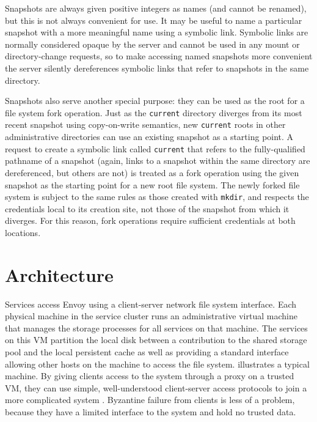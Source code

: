 Snapshots are always given positive integers as names (and cannot be renamed), but this is not always convenient for use. It may be useful to name a particular snapshot with a more meaningful name using a symbolic link. Symbolic links are normally considered opaque by the server and cannot be used in any mount or directory-change requests, so to make accessing named snapshots more convenient the server silently dereferences symbolic links that refer to snapshots in the same directory.

Snapshots also serve another special purpose: they can be used as the root for a file system fork operation. Just as the \texttt{current} directory diverges from its most recent snapshot using copy-on-write semantics, new \texttt{current} roots in other administrative directories can use an existing snapshot as a starting point. A request to create a symbolic link called \texttt{current} that refers to the fully-qualified pathname of a snapshot (again, links to a snapshot within the same directory are dereferenced, but others are not) is treated as a fork operation using the given snapshot as the starting point for a new root file system. The newly forked file system is subject to the same rules as those created with \texttt{mkdir}, and respects the credentials local to its creation site, not those of the snapshot from which it diverges. For this reason, fork operations require sufficient credentials at both locations.

\section{Architecture}

Services access Envoy using a client-server network file system interface. Each physical machine in the service cluster runs an administrative virtual machine that manages the storage processes for all services on that machine. The services on this VM partition the local disk between a contribution to the shared storage pool and the local persistent cache as well as providing a standard interface allowing other hosts on the machine to access the file system.  illustrates a typical machine. By giving clients access to the system through a proxy on a trusted VM, they can use simple, well-understood client-server access protocols to join a more complicated system \cite{shapiro}. Byzantine failure from clients is less of a problem, because they have a limited interface to the system and hold no trusted data.

